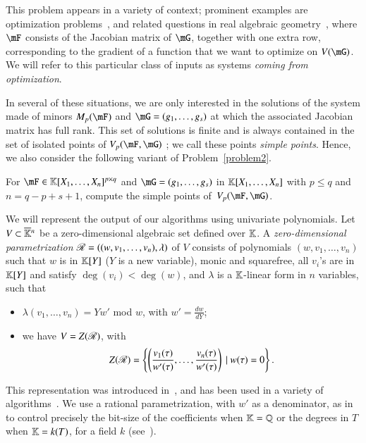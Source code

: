 This problem appears in a variety of context; prominent examples are
optimization problems~\cite{GSZ10,JP14,BGHS14,GS14,NDS06}, and related questions
in real algebraic
geometry~\cite{ARS,BaGiHeMb01,BaGiHePa05,BGHSS,BRSS,RealDecompICMS,CellDecompSurface,BertiniReal,RealNumerical,SaSc03,SaSc11,SaSc17},
where $\mF$ consists of the Jacobian matrix of $\mG$, together with one extra
row, corresponding to the gradient of a function that we want to optimize on
$V(\mG)$. We will refer to this particular class of inputs as systems {\em
  coming from optimization}. %

In several of these situations, we are only interested in the solutions of the
system made of minors $M_p(\mF)$ and $\mG=(g_1,\dots,g_s)$ at which the
associated Jacobian matrix has full rank. This set of solutions is finite and is
always contained in the set of isolated points of $\VpFG{p}{\mF}{\mG}$
\cite[Theorem 16.19]{Eisenbud95}; we call these points {\em simple points}. %
Hence, we also consider the following variant of
Problem~\eqref{problem2}.

\begin{pbm} \label{problem3} For 
  $\mF \in \KK[X_1,\dots,X_n]^{p \times q}$ and 
  $\mG=(g_1,\dots,g_s)$ in $\mathbb{K}[X_1,\dots,X_n]$ with $p \leq q$ and
  $n = q-p+s+1$, compute the simple  points of~$\VpFG{p}{\mF}{\mG}$.
\end{pbm}

We will represent the output of our algorithms using univariate polynomials. Let
$V \subset \overline{\mathbb{K}}{}^n$ be a zero-dimensional algebraic set defined over $\mathbb{K}$. A
\emph{zero-dimensional parametrization} $\mathscr{R} = ((w,v_1, \ldots, v_n),
\lambda)$ of $V$ consists of polynomials $(w,v_1, \ldots, v_n)$ such that $w$ 
is in
$\mathbb{K}[Y]$ ($Y$ is a new variable), monic and squarefree, all $v_i$'s are in
$\mathbb{K}[Y]$ and satisfy $\deg(v_i) < \deg(w)$, and $\lambda$ is a $\mathbb{K}$-linear form
in $n$ variables, such that
\begin{itemize}
\item $\lambda(v_1, \ldots, v_n) = Yw'$ mod $w$, with $w'=\frac{d w}{d Y}$;
\item we have $V = Z(\mathscr{R})$, with $$Z(\mathscr{R})= \left\{\left(\frac{v_1(\tau)}{w'(\tau)}, \ldots, \frac{v_n(\tau)}{w'(\tau)}\right) \ | \ w(\tau) = 0\right\}.$$
\end{itemize}
This representation was introduced in~\cite{Kronecker82,Macaulay16}, and has
been used in a variety of
algorithms~\cite{GiMo89,GiHeMoPa95,ABRW,GiHeMoMoPa98,Rouillier99,GiLeSa01}. We
use a rational parametrization, with $w'$ as a denominator, as
in~\cite{ABRW,Rouillier99,GiLeSa01} to control precisely the bit-size of the
coefficients when $\mathbb{K}=\mathbb{Q}$ or the degrees in $T$ when $\mathbb{K}=k(T)$, for a field
$k$ (see~\cite{Schost03,DaSc04}). 

